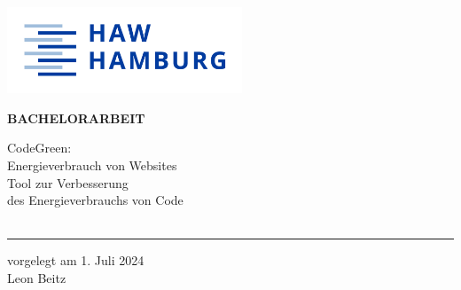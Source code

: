 \begin{titlepage}
  \color{haw}
  \raggedright
  \hfill\includegraphics[width=7cm]{HAW_Marke_RGB_300dpi}\\

  \vspace{5cm}

  \setmainfont{Open Sans}
  \small
  \textbf{BACHELORARBEIT}

  \vspace{8mm}

  \begin{minipage}{0.8\linewidth}
    \setmainfont{Martel Heavy}
    \LARGE
    CodeGreen:\\[1mm]
    Energieverbrauch von Websites\\[1mm]
    Tool zur Verbesserung\\[1mm]
    des Energieverbrauchs von Code\\
    \,\rule{11mm}{1.2mm}
  \end{minipage}

  \vspace{1cm}

  vorgelegt am 1. Juli 2024\\
  Leon Beitz


\end{titlepage}
